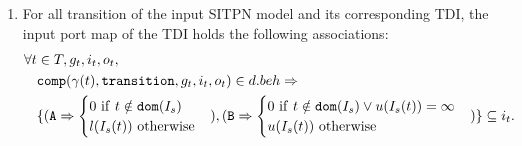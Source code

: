 \begin{definition}
\begin{enumerate}[resume]
  \item For all transition of the input SITPN model and its corresponding TDI, the input port map of the TDI holds the following associations:\\
    \begin{equation*}
      \begin{aligned}[t]
        \forall{}t&\in{}T,g_t,i_t,o_t, \\
                  & \mathtt{comp}(\gamma(t),\mathtt{transition},g_t,i_t,o_t)\in{}d.beh\Rightarrow \\
                  & \{(\mathtt{A}\Rightarrow\begin{cases}
                                              0~\mathrm{if}~t\notin\mathtt{dom}(I_s) \\
                                              l(I_s(t))~\mathrm{otherwise} \\
                                            \end{cases}),
        (\mathtt{B}\Rightarrow\begin{cases}
                                0~\mathrm{if}~t\notin\mathtt{dom}(I_s)\lor{}u(I_s(t))=\infty \\
                                u(I_s(t))~\mathrm{otherwise} \\
                              \end{cases})\}\subseteq{}i_t. \\
      \end{aligned}
    \end{equation*}
    
    

\end{enumerate}
\end{definition}
